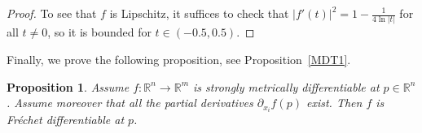 \documentclass[12pt,leqno]{amsart}
\newtheorem{proposition}[theorem]{Proposition}
\theoremstyle{definition}
\newcommand{\bbbr}{\mathbb R}
\numberwithin{theorem}{section} \numberwithin{equation}{section}
\begin{document}
\begin{proof}

To see that $f$ is Lipschitz, it suffices to check that $|f'(t)|^2=1-\frac{1}{4\ln|t|}$ for all $t\neq 0$, so it is bounded for $t\in (-0.5,0.5)$.
\end{proof}

Finally, we prove the following proposition, see Proposition~\ref{MDT1}.

\begin{proposition}
\label{1:prop1}
Assume $f:\bbbr^n\to \bbbr^m$ is strongly metrically differentiable at ${p\in\bbbr^n}$. Assume moreover that all the partial derivatives $\partial_{x_i} f(p)$ exist. Then $f$ is Fr\'echet differentiable at $p$.
\end{proposition}
\end{document}
